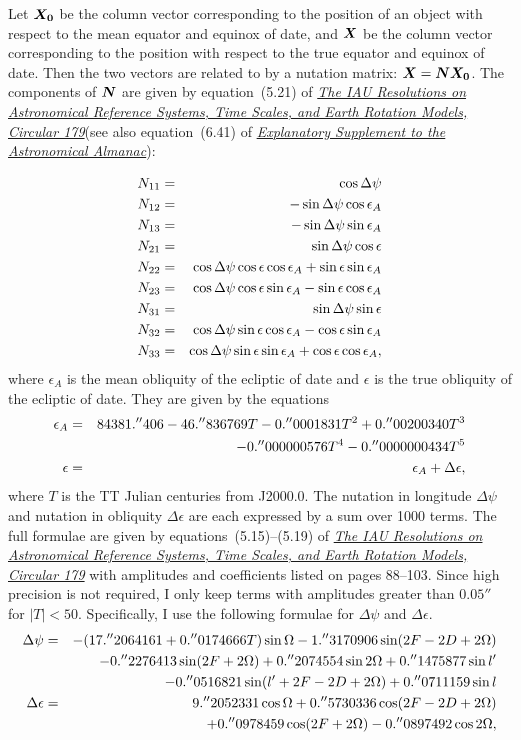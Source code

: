 \documentclass[12pt]{article}
\newcommand \beqn {\begin{eqnarray}}
\newcommand \eeqn {\end{eqnarray}}
\newcommand{\ve}[1]{\mbox{\boldmath $#1$}}
\newcommand{\expl}{\href{http://www.uscibooks.com/urban.htm}{\it Explanatory Supplement to the Astronomical Almanac}}
\newcommand{\kaplan}{\href{https://arxiv.org/abs/astro-ph/0602086}{\it The IAU Resolutions on Astronomical Reference Systems, Time Scales, and Earth Rotation Models, Circular 179}}
\begin{document}
Let $\ve{X_0}$ be the column vector corresponding to the position of an object 
with respect to the mean equator and equinox of date, and $\ve{X}$ be the column 
vector corresponding to the position with respect to the true equator and equinox of date. 
Then the two vectors are related to by a nutation matrix: $\ve{X} = \ve{N} \ve{X_0}$. 
The components of $\ve{N}$ are given by equation~(5.21) of \kaplan (see also equation~(6.41) 
of \expl):

\beqn
  N_{11} &=& \cos \Delta \psi \cr
  N_{12} &=& -\sin \Delta \psi \cos \epsilon_A \cr
  N_{13} &=& -\sin \Delta \psi \sin \epsilon_A \cr
  N_{21} &=& \sin \Delta \psi \cos \epsilon \cr
  N_{22} &=& \cos \Delta \psi \cos \epsilon \cos \epsilon_A + \sin \epsilon \sin \epsilon_A
\label{eq:nutationMatrix} \\
  N_{23} &=& \cos \Delta \psi \cos \epsilon \sin \epsilon_A - \sin \epsilon \cos \epsilon_A\cr
  N_{31} &=& \sin \Delta \psi \sin \epsilon \cr
  N_{32} &=& \cos \Delta \psi \sin \epsilon \cos \epsilon_A - \cos \epsilon \sin \epsilon_A\cr
  N_{33} &=& \cos \Delta \psi \sin \epsilon \sin \epsilon_A + \cos \epsilon \cos \epsilon_A ,
\nonumber
\eeqn
where $\epsilon_A$ is the mean obliquity of the ecliptic of date and $\epsilon$ is the 
true obliquity of the ecliptic of date. They are given by the equations 
\beqn
  \epsilon_A &=& 84381.''406 - 46.''836769 T - 0.''0001831 T^2 + 0.''00200340 T^3 \cr
&& - 0.''000000576 T^4 - 0.''0000000434 T^5 \label{eq:epsA} \\
  \epsilon &=& \epsilon_A + \Delta \epsilon ,
\eeqn
where $T$ is the TT Julian centuries from J2000.0. The nutation in longitude $\Delta \psi$ 
and nutation in obliquity $\Delta \epsilon$ are each expressed by a sum over 1000 terms. 
The full formulae 
are given by equations~(5.15)--(5.19) of \kaplan{} with amplitudes and coefficients listed on 
pages 88--103. Since high precision is not required, I only keep terms with 
amplitudes greater than $0.05''$ for $|T| < 50$. Specifically, I use the following formulae 
for $\Delta \psi$ and $\Delta \epsilon$. 
\beqn
  \Delta \psi &=& -(17.''2064161 + 0.''0174666T) \sin \Omega 
- 1.''3170906 \sin (2F - 2D + 2\Omega) \cr 
&& -0.''2276413 \sin(2F+2\Omega) + 0.''2074554\sin 2\Omega + 0.''1475877\sin l' \cr 
&& - 0.''0516821 \sin (l' + 2F - 2D + 2\Omega) + 0.''0711159 \sin l \label{eq:Dpsi} \\ 
  \Delta \epsilon &=& 9.''2052331 \cos \Omega + 0.''5730336 \cos(2F - 2D + 2\Omega) \cr 
&& +0.''0978459 \cos(2F+2\Omega) - 0.''0897492 \cos 2\Omega , \label{eq:Deps} 
\eeqn
\end{document}
